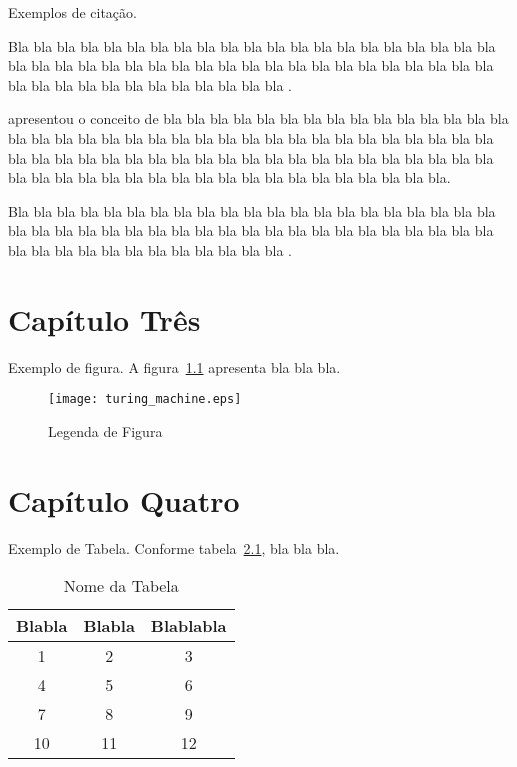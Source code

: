 \documentclass[tcc,ec]{texfurg} %
\begin{document}
Exemplos de citação. 

Bla bla bla bla bla bla bla bla bla
bla bla bla bla bla bla bla bla bla bla bla bla bla bla bla bla bla
bla bla bla bla bla bla bla bla bla bla bla bla bla bla bla bla
bla bla bla bla bla bla bla bla bla bla bla bla
\citep{knuth:84}.

\citet{boulic:91} apresentou o conceito de bla bla bla bla bla bla bla
bla bla bla bla bla bla bla bla bla bla bla bla bla bla bla bla bla
bla bla bla bla bla bla bla bla bla bla bla bla bla bla bla bla
bla bla bla bla bla bla bla bla bla bla bla bla bla bla bla bla bla
bla bla bla bla bla bla bla bla bla bla bla bla bla bla bla bla bla
bla bla.

 Bla bla bla bla bla bla bla bla bla
bla bla bla bla bla bla bla bla bla bla bla bla bla bla bla bla bla
bla bla bla bla bla bla bla bla bla bla bla bla bla bla bla bla
bla bla bla bla bla bla bla bla bla bla bla bla
\citep{knuth:84, smith:99}.


\chapter{Capítulo Três}


Exemplo de figura. A figura~\ref{nome_figura} apresenta bla bla bla.

      \begin{figure}[htbp]
        \centering \texttt{[image: turing\_machine.eps]}
        \caption{Legenda de Figura}
        \label{nome_figura}
    \end{figure}

\chapter{Capítulo Quatro}

Exemplo de Tabela. Conforme tabela~\ref{tabela}, bla bla bla.

\begin{table}[htbp]
\begin{center}
\caption{Nome da Tabela}
\label{tabela}
\begin{tabular}{ccc}
\hline
Blabla & Blabla & Blablabla\\
\hline
1 & 2  & 3 \\
4 & 5  & 6 \\
7 & 8  & 9 \\
10 & 11  & 12 \\
\hline
\end{tabular}
\end{center}
\end{table}
\end{document}
